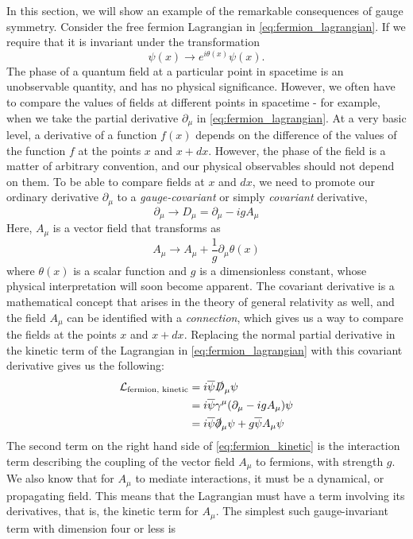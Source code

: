  In this section, we will show an example of the remarkable consequences of gauge symmetry. Consider the free fermion Lagrangian in \eqref{eq:fermion_lagrangian}. If we require that it is invariant under the transformation
\begin{equation}\label{eq:fermion_field_transformation}
  \psi(x)\rightarrow e^{i\theta(x)}\psi(x).
\end{equation}
The phase of a quantum field at a particular point in spacetime is an unobservable quantity, and has no physical significance. However, we often have to compare the values of fields at different points in spacetime - for example, when we take the partial derivative $\partial_\mu$ in \eqref{eq:fermion_lagrangian}. At a very basic level, a derivative of a function $f(x)$ depends on the difference of the values of the function $f$ at the points $x$ and $x + dx$. However, the phase of the field is a matter of arbitrary convention, and our physical observables should not depend on them. To be able to compare fields at $x$ and $dx$, we need to promote our ordinary derivative $\partial_\mu$ to a \emph{gauge-covariant} or simply \emph{covariant} derivative,
$$\partial_\mu \rightarrow D_\mu = \partial_\mu - igA_\mu$$
Here, $A_\mu$ is a vector field that transforms as%
%
$$A_\mu\rightarrow A_\mu + \frac{1}{g}\partial_\mu\theta(x)$$
%
where $\theta(x)$ is a scalar function and $g$ is a dimensionless constant, whose physical interpretation will soon become apparent. The covariant derivative is a mathematical concept that arises in the theory of general relativity as well, and the field $A_\mu$ can be identified with a \emph{connection}, which gives us a way to compare the fields at the points $x$ and $x + dx$.
Replacing the normal partial derivative in the kinetic term of the Lagrangian in \eqref{eq:fermion_lagrangian} with this covariant derivative gives us the following: 
\begin{equation}\label{eq:fermion_kinetic}
    \begin{split}
  \mathcal{L}_\text{fermion, kinetic} &= i\overline{\psi}\slashed{D}_\mu\psi\\
&= i\overline{\psi}\gamma^\mu(\partial_\mu-igA_\mu)\psi\\
&= i\overline{\psi}\slashed{\partial}_\mu\psi + g\overline{\psi}A_\mu\psi
\end{split}
\end{equation}
The second term on the right hand side of \eqref{eq:fermion_kinetic} is the interaction term describing the coupling of the vector field $A_\mu$ to fermions, with strength $g$. We also know that for $A_\mu$ to mediate interactions, it must be a dynamical, or propagating field. This means that the Lagrangian must have a term involving its derivatives, that is, the kinetic term for $A_\mu$. The simplest such gauge-invariant term with dimension four or less is %
